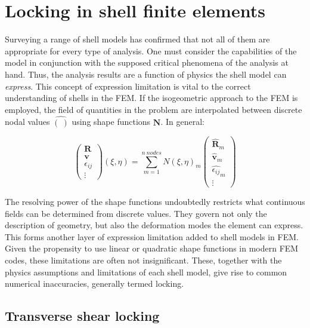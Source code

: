 \section{Locking in shell finite elements}

Surveying a range of shell models has confirmed that not all of them are appropriate for every type of analysis. One must consider the capabilities of the model in conjunction with the supposed critical phenomena of the analysis at hand. Thus, the analysis results are a function of physics the shell model can \textit{express}. This concept of expression limitation is vital to the correct understanding of shells in the FEM. If the isogeometric approach to the FEM is employed, the field of quantities in the problem are interpolated between discrete nodal values $\hat{(\ )}$ using shape functions $\mathbf{N}$. In general:

\singlespacing
\begin{equation} 
\begin{pmatrix}
\mathbf{R} \\
\mathbf{v} \\
\epsilon_{ij} \\
\vdots
\end{pmatrix}
(\xi,\eta)
=
\sum_{m=1}^{n\ nodes}
N(\xi,\eta)_m
{\begin{pmatrix}
	\hat{\mathbf{R}}_m \\
	\hat{\mathbf{v}}_m \\
	\hat{\epsilon_{ij}}_m \\
	\vdots
	\end{pmatrix}}
\label{eqfemtech1}
\end{equation}

\doublespacing

The resolving power of the shape functions undoubtedly restricts what continuous fields can be determined from discrete values. They govern not only the description of geometry, but also the deformation modes the element can express. This forms another layer of expression limitation added to shell models in FEM. Given the propensity to use linear or quadratic shape functions in modern FEM codes, these limitations are often not insignificant. These, together with the physics assumptions and limitations of each shell model, give rise to common numerical inaccuracies, generally termed locking.

\subsection{Transverse shear locking} \label{transverse_shear_locking}

